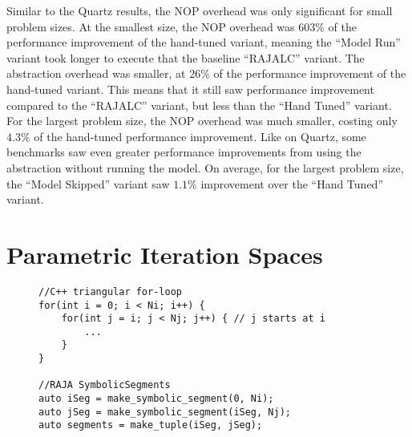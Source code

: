 Similar to the Quartz results, the NOP overhead was only significant for small problem sizes.
At the smallest size, the NOP overhead was $603\%$ of the performance improvement of the hand-tuned variant, meaning the ``Model Run'' variant took longer to execute that the baseline ``RAJALC'' variant.
The abstraction overhead was smaller, at $26\%$ of the performance improvement of the hand-tuned variant.
This means that it still saw performance improvement compared to the ``RAJALC'' variant, but less than the ``Hand Tuned'' variant.
For the largest problem size, the NOP overhead was much smaller, costing only $4.3\%$ of the hand-tuned performance improvement.
Like on Quartz, some benchmarks saw even greater performance improvements from using the \FormatDecisions{} abstraction without running the model.
On average, for the largest problem size, the ``Model Skipped'' variant saw $1.1\%$ improvement over the ``Hand Tuned'' variant.



\section{Parametric Iteration Spaces}

\begin{figure}
\begin{lstlisting}[caption={Comparison of C++ for-loop and RAJA \texttt{SymbolicSegment} representations of a loop nest with a triangular iteration space.},label=triangularComparison]
//C++ triangular for-loop
for(int i = 0; i < Ni; i++) {
	for(int j = i; j < Nj; j++) { // j starts at i
		... 
	}
}

//RAJA SymbolicSegments
auto iSeg = make_symbolic_segment(0, Ni);
auto jSeg = make_symbolic_segment(iSeg, Nj);
auto segments = make_tuple(iSeg, jSeg);
\end{lstlisting}
\end{figure}

